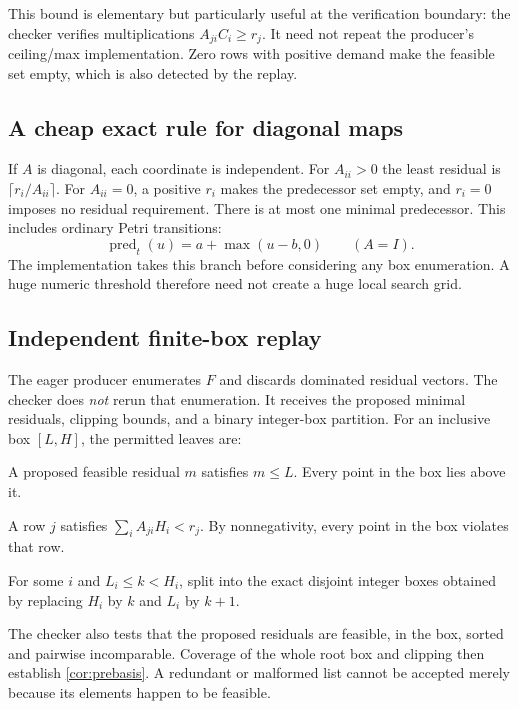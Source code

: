 \documentclass[11pt,a4paper]{article}
\theoremstyle{definition}
\begin{document}
This bound is elementary but particularly useful at the verification boundary:
the checker verifies multiplications $A_{ji}C_i\geq r_j$. It need not repeat
the producer's ceiling/max implementation. Zero rows with positive demand
make the feasible set empty, which is also detected by the replay.

\subsection{A cheap exact rule for diagonal maps}
If $A$ is diagonal, each coordinate is independent. For $A_{ii}>0$ the
least residual is $\lceil r_i/A_{ii}\rceil$. For $A_{ii}=0$, a positive
$r_i$ makes the predecessor set empty, and $r_i=0$ imposes no residual
requirement. There is at most one minimal predecessor. This includes ordinary
Petri transitions:
\begin{equation}
 \operatorname{pred}_t(u)=a+\max(u-b,0)
 \qquad(A=I).
 \label{eq:petri-pre}
\end{equation}
The implementation takes this branch before considering any box enumeration.
A huge numeric threshold therefore need not create a huge local search grid.

\subsection{Independent finite-box replay}
The eager producer enumerates $F$ and discards dominated residual vectors.
The checker does \emph{not} rerun that enumeration. It receives the proposed
minimal residuals, clipping bounds, and a binary integer-box partition.
For an inclusive box $[L,H]$, the permitted leaves are:
\begin{description}[style=nextline,leftmargin=1.5em]
\item[Covered.] A proposed feasible residual $m$ satisfies $m\leq L$.
Every point in the box lies above it.
\item[Impossible.] A row $j$ satisfies $\sum_i A_{ji}H_i<r_j$.
By nonnegativity, every point in the box violates that row.
\item[Split.] For some $i$ and $L_i\leq k<H_i$, split into the exact disjoint
integer boxes obtained by replacing $H_i$ by $k$ and $L_i$ by $k+1$.
\end{description}
The checker also tests that the proposed residuals are feasible, in the box,
sorted and pairwise incomparable. Coverage of the whole root box and clipping
then establish \cref{cor:prebasis}. A redundant or malformed list cannot be
accepted merely because its elements happen to be feasible.
\end{document}

